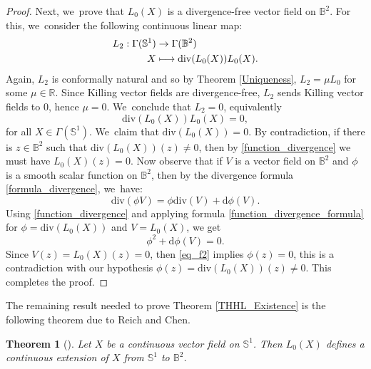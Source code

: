 \documentclass[JEP,XML,SOM,Unicode,NoEqCountersInSection, NoFloatCountersInSection,published]{cedram}
\newcommand\mto{\mathchoice{\longmapsto}{\mapsto}{\mapsto}{\mapsto}}
\theoremstyle{plain}
\newtheorem{theorem}[cor]{Theorem}
\theoremstyle{definition}
\begin{document}
\begin{proof}
Next, we~prove that $L_0(X)$ is a divergence-free vector field on $\mathbb{B}^2$. For this, we~consider the following continuous linear map:
\[
\begin{aligned}
L_2:\Gamma(\mathbb{S}^1) & \to \Gamma(\mathbb{B}^2) \\
X & \mto \mathrm{div}(L_0(X))L_0(X).
\end{aligned}
\]
Again, $L_2$ is conformally natural and so by Theorem \ref{Uniqueness}, $L_2=\mu L_0$ for some $\mu\in\mathbb{R}$. Since Killing vector fields are divergence-free, $L_2$ sends Killing vector fields to $0$, hence $\mu=0$. We~conclude that $L_2=0$, equivalently \begin{equation}\label{function_divergence}
\mathrm{div}(L_0(X))L_0(X)=0,
\end{equation} for all $X\in\Gamma(\mathbb{S}^1)$. We~claim that $\mathrm{div}(L_0(X))=0$. By contradiction, if there is $z\in\mathbb{B}^2$ such that $\mathrm{div}(L_0(X))(z)\neq0$, then by \eqref{function_divergence} we must have $L_0(X)(z)=0$. Now observe that if $V$ is a vector field on $\mathbb{B}^2$ and $\phi$ is a smooth scalar function on $\mathbb{B}^2$, then by the divergence formula \eqref{formula_divergence}, we~have:
\begin{equation}\label{function_divergence_formula}
\mathrm{div}(\phi V)=\phi\mathrm{div}(V)+\mathrm{d}\phi(V).
\end{equation}
Using \eqref{function_divergence} and applying formula \eqref{function_divergence_formula} for $\phi=\mathrm{div}(L_0(X))$ and $V=L_0(X)$, we get
\begin{equation}\label{eq_f2}
\phi^2+\mathrm{d}\phi(V)=0.
\end{equation} Since $V(z)=L_0(X)(z)=0$, then \eqref{eq_f2} implies $\phi(z)=0$, this is a contradiction with our hypothesis $\phi(z)=\mathrm{div}(L_0(X))(z)\neq 0$. This completes the proof.
\end{proof}
The remaining result needed to prove Theorem \ref{THHL_Existence} is the following theorem due to Reich and Chen.
\begin{theorem}[\cite{Extension_with_bounded_derivative}]\label{extension_Reich}
Let $X$ be a continuous vector field on $\mathbb{S}^1$. Then $L_0(X)$ defines a continuous extension of $X$ from $\mathbb{S}^1$ to $\mathbb{B}^2$.
\end{theorem}
\end{document}
